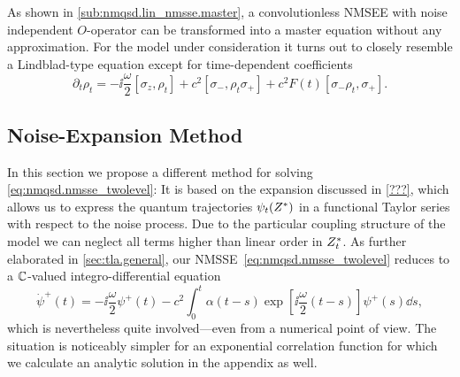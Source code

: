 As shown in \autoref{sub:nmqsd.lin_nmsse.master}, a convolutionless NMSEE with noise independent $O$-operator can be transformed into a master equation without any approximation.
For the model under consideration it turns out to closely resemble a Lindblad-type equation except for time-dependent coefficients
\begin{equation*}
  \partial_t \rho_t = -\ii \frac{\omega}{2} [\sigma_z, \rho_t] + c^2 [\sigma_-, \rho_t \sigma_+] + c^2 F(t) [\sigma_- \rho_t, \sigma_+].
  \label{eq:nmqsd.two_level_master}
\end{equation*}


\subsection{Noise-Expansion Method}
\label{sub:nmqsd.expansion}

In this section we propose a different method for solving \autoref{eq:nmqsd.nmsse_twolevel}:
It is based on the expansion discussed in \autoref{???}, which allows us to express the quantum trajectories $\psitZ$ in a functional Taylor series with respect to the noise process.
Due to the particular coupling structure of the model we can neglect all terms higher than linear order in ${Z}^*_t$.
As further elaborated in \autoref{sec:tla.general}, our NMSSE~\ref{eq:nmqsd.nmsse_twolevel} reduces to a $\mathbb{C}$-valued integro-differential equation
\begin{equation}
  \dot\psi^+(t) = -\ii \frac{\omega}{2} \psi^+(t) - c^2 \int_0^t \alpha(t - s) \exp[\ii \frac{\omega}{2} (t - s)] \psi^+(s) \dd s,
  \label{eq:nmqsd.dotpsi_plus}
\end{equation}
which is nevertheless quite involved---even from a numerical point of view.
The situation is noticeably simpler for an exponential correlation function for which we calculate an analytic solution in the appendix as well.

